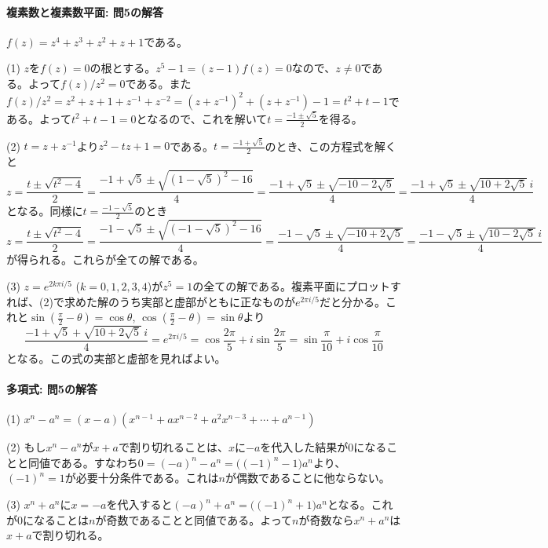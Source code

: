 \paragraph{複素数と複素数平面: 問5の解答} $f(z)=z^4+z^3+z^2+z+1$である。

\noindent (1) $z$を$f(z)=0$の根とする。$z^5-1=(z-1)f(z)=0$なので、$z\neq 0$である。よって$f(z)/z^2=0$である。また$f(z)/z^2=z^2+z+1+z^{-1}+z^{-2} = (z+z^{-1})^2 + (z+z^{-1}) - 1 = t^2+t-1$である。よって$t^2+t-1=0$となるので、これを解いて$t=\frac{-1\pm\sqrt{5}}{2}$を得る。

\noindent (2) $t=z+z^{-1}$より$z^2-tz+1=0$である。$t=\frac{-1+\sqrt{5}}{2}$のとき、この方程式を解くと
\[
z = \frac{t\pm\sqrt{t^2-4}}{2} = \frac{-1+\sqrt{5}\pm\sqrt{(1-\sqrt{5})^2-16}}{4}
= \frac{-1+\sqrt{5}\pm\sqrt{-10-2\sqrt{5}}}{4}
= \frac{-1+\sqrt{5}\pm\sqrt{10+2\sqrt{5}}\,i}{4}
\]
となる。同様に$t=\frac{-1-\sqrt{5}}{2}$のとき
\[
z = \frac{t\pm\sqrt{t^2-4}}{2} = \frac{-1-\sqrt{5}\pm\sqrt{(-1-\sqrt{5})^2-16}}{4}
= \frac{-1-\sqrt{5}\pm\sqrt{-10+2\sqrt{5}}}{4}
= \frac{-1-\sqrt{5}\pm\sqrt{10-2\sqrt{5}}\,i}{4}
\]
が得られる。これらが全ての解である。

\noindent (3) $z = e^{2k\pi i/5}$ ($k=0,1,2,3,4$)が$z^5=1$の全ての解である。複素平面にプロットすれば、(2)で求めた解のうち実部と虚部がともに正なものが$e^{2\pi i/5}$だと分かる。これと$\sin(\frac{\pi}{2}-\theta) = \cos\theta$, $\cos(\frac{\pi}{2}-\theta) = \sin\theta$より
\[
\frac{-1+\sqrt{5}+\sqrt{10+2\sqrt{5}}\,i}{4} = e^{2\pi i/5}
= \cos\frac{2\pi}{5} + i \sin \frac{2\pi}{5} = \sin\frac{\pi}{10} + i \cos \frac{\pi}{10}
\]
となる。この式の実部と虚部を見ればよい。

\paragraph{多項式: 問5の解答}
\noindent (1) $x^n-a^n = (x-a)(x^{n-1}+ax^{n-2}+a^2x^{n-3}+\cdots+a^{n-1})$

\noindent (2) もし$x^n-a^n$が$x+a$で割り切れることは、$x$に$-a$を代入した結果が$0$になることと同値である。すなわち$0=(-a)^n-a^n=\bigl((-1)^n-1\bigr)a^n$より、$(-1)^n=1$が必要十分条件である。これは$n$が偶数であることに他ならない。

\noindent (3) $x^n+a^n$に$x=-a$を代入すると$(-a)^n+a^n = \bigl((-1)^n+1\bigr)a^n$となる。これが$0$になることは$n$が奇数であることと同値である。よって$n$が奇数なら$x^n+a^n$は$x+a$で割り切れる。

